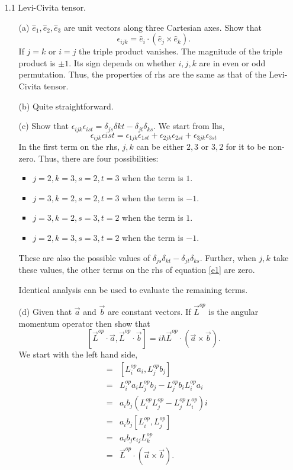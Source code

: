 \documentclass{report}
\begin{document}
\begin{enumerate}
\item[1.1] Levi-Civita tensor.
\begin{enumerate}
\item[(a)] $\hat{e}_1, \hat{e}_2, \hat{e}_3$ are unit vectors along three 
Cartesian axes. Show that
\[
\epsilon_{ijk} = \hat{e}_i\cdot(\hat{e}_j \times \hat{e}_k).
\]
If $j = k$ or $i = j$ the triple product vanishes. The magnitude of the
triple product is $\pm 1$. Its sign depends on whether $i, j, k$ are in
even or odd permutation. Thus, the properties of rhs are the same as that of
the Levi-Civita tensor.

\item[(b)] Quite straightforward.

\item[(c)] Show that $\epsilon_{ijk}\epsilon_{ist} = \delta_{js}\delta{kt} 
- \delta_{jt}\delta_{ks}$.
We start from lhs,
\begin{equation}\label{e1}
\epsilon_{ijk}\epsilon{ist} = \epsilon_{1jk}\epsilon_{1st} +
                              \epsilon_{2jk}\epsilon_{2st} +
                              \epsilon_{3jk}\epsilon_{3st} 
\end{equation}
In the first term on the rhs, $j, k$ can be either $2, 3$ or $3, 2$ for it
to be non-zero. Thus, there are four possibilities:
\begin{itemize}
\item $j = 2, k = 3, s = 2, t = 3$ when the term is $1$.
\item $j = 3, k = 2, s = 2, t = 3$ when the term is $-1$.
\item $j = 3, k = 2, s = 3, t = 2$ when the term is $1$.
\item $j = 2, k = 3, s = 3, t = 2$ when the term is $-1$.
\end{itemize}
These are also the possible values of $\delta_{js}\delta_{kt} - \delta_{jt}
\delta_{ks}$. Further, when $j, k$ take these values, the other terms on
the rhs of equation \eqref{e1} are zero.

Identical analysis can be used to evaluate the remaining terms.

\item[(d)] Given that $\vec{a}$ and $\vec{b}$ are constant vectors. If
$\vec{L}^{op}$ is the angular momentum operator then show that
\[
[\vec{L}^{op}\cdot\vec{a}, \vec{L}^{op}\cdot\vec{b}] = i\hbar\vec{L}^{op}
\cdot (\vec{a} \times \vec{b}).
\]
We start with the left hand side,
\begin{eqnarray*}
[\vec{L}^{op}\cdot\vec{a}, \vec{L}^{op}\cdot\vec{b}] 
    &=& [L^{op}_i a_i, L^{op}_j b_j] \\
    &=& L^{op}_i a_i L^{op}_j b_j - L^{op}_j b_i L^{op}_i a_i \\
    &=& a_ib_j(L^{op}_i L^{op}_j - L^{op}_j L^{op}_i) i\\
    &=& a_ib_j[L^{op}_i, L^{op}_j] \\
    &=& a_ib_j\epsilon_{ij}L^{op}_k \\
    &=& \vec{L}^{op}\cdot(\vec{a} \times \vec{b}).
\end{eqnarray*}
\end{enumerate}


\end{enumerate}
\end{document}
